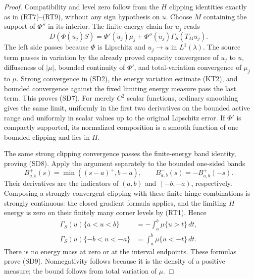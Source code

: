 \documentclass[11pt,a4paper]{article}
\numberwithin{equation}{section}
\theoremstyle{definition}
\theoremstyle{remark}
\begin{document}
\begin{proof}
Compatibility and level zero follow from the $H$ clipping
identities exactly as in (RT7)--(RT9), without any sign
hypothesis on $u$.  Choose $M$ containing the support of
$\Phi''$ in its interior.  The finite-energy chain for $u_j$
reads
\[
 D(\Phi(u_j)S)=\Phi'(\widetilde u_j)\mu_j
                         +\Phi''(\widetilde u_j)\Gamma_S(T_Mu_j).
\]
The left side passes because $\Phi$ is Lipschitz and
$u_j\to u$ in $L^1(\lambda)$.  The source term passes in
variation by the already proved capacity convergence of $u_j$
to $u$, diffuseness of $|\mu|$, bounded continuity of $\Phi'$, and
total-variation convergence of $\mu_j$ to $\mu$.
Strong convergence in (SD2), the energy variation estimate
(KT2), and bounded convergence against the fixed limiting
energy measure pass the last term.  This proves (SD7).
For merely $C^2$ scalar functions, ordinary smoothing gives
the same limit, uniformly in the first two derivatives on
the bounded active range and uniformly in scalar values
up to the original Lipschitz error.
If $\Phi'$ is compactly supported, its normalized composition
is a smooth function of one bounded clipping and lies in $H$.

The same strong clipping convergence passes the finite-energy
band identity, proving (SD8).  Apply the argument separately
to the bounded one-sided bands
\[
 B^+_{a,b}(s)=\min((s-a)^+,b-a),\qquad
 B^-_{a,b}(s)=-B^+_{a,b}(-s).
\]
Their derivatives are the indicators of $(a,b)$ and
$(-b,-a)$, respectively.  Composing a strongly convergent
clipping with these finite hinge combinations is strongly
continuous: the closed gradient formula applies, and the
limiting $H$ energy is zero on their finitely many corner
levels by (RT1).  Hence
\[
 \begin{split}
 \Gamma_S(u)\{a<u<b\}&=-\int_a^b\mu\{u>t\}\,dt,\\
 \Gamma_S(u)\{-b<u<-a\}&=\int_a^b\mu\{u<-t\}\,dt.
 \end{split}
\]
There is no energy mass at zero or at the interval endpoints.
These formulas prove (SD9).  Nonnegativity follows because
it is the density of a positive measure; the bound follows
from total variation of $\mu$.
\end{proof}
\end{document}
